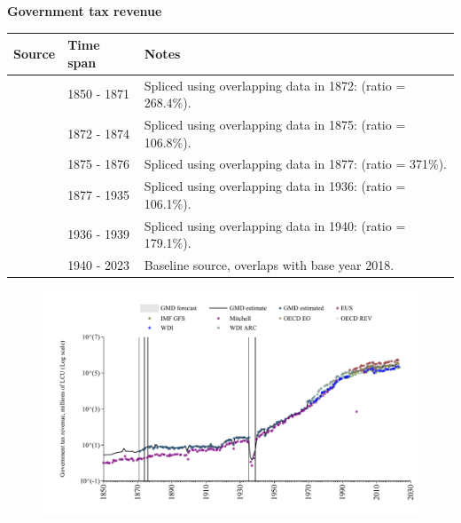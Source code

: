 \documentclass[12pt,a4paper,landscape]{article}
\begin{document}
\begin{adjustbox}{max totalsize={\paperwidth}{\paperheight},center}
\begin{minipage}[t][\textheight][t]{\textwidth}
\vspace*{0.5cm}
{}
\begin{center}
{\Large\bfseries Government tax revenue}
\end{center}
\vspace{0.5cm}
\begin{table}[H]
\centering
\small
\begin{tabular}{|l|l|l|}
\hline
\textbf{Source} & \textbf{Time span} & \textbf{Notes} \\
\hline
\rowcolor{white}\cite{Mitchell}& 1850 - 1871 &Spliced using overlapping data in 1872: (ratio = 268.4\%). \\
\rowcolor{lightgray}\cite{GMD_estimated}& 1872 - 1874 &Spliced using overlapping data in 1875: (ratio = 106.8\%). \\
\rowcolor{white}\cite{Mitchell}& 1875 - 1876 &Spliced using overlapping data in 1877: (ratio = 371\%). \\
\rowcolor{lightgray}\cite{GMD_estimated}& 1877 - 1935 &Spliced using overlapping data in 1936: (ratio = 106.1\%). \\
\rowcolor{white}\cite{Mitchell}& 1936 - 1939 &Spliced using overlapping data in 1940: (ratio = 179.1\%). \\
\rowcolor{lightgray}\cite{GMD_estimated}& 1940 - 2023 &Baseline source, overlaps with base year 2018. \\
\hline
\end{tabular}
\end{table}
\begin{figure}[H]
\centering
\includegraphics[width=\textwidth,height=0.6\textheight,keepaspectratio]{graphs/ESP_govtax.pdf}
\end{figure}
\end{minipage}
\end{adjustbox}
\end{document}
